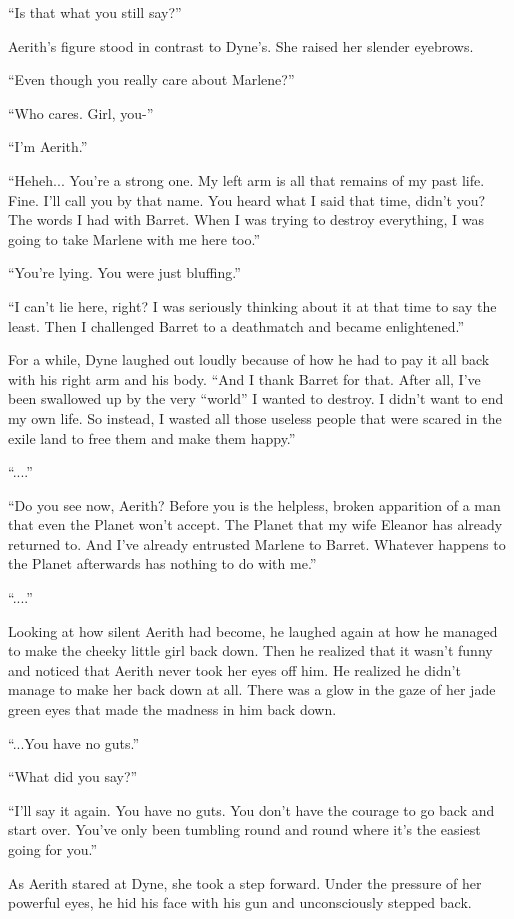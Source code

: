 \documentclass[oneside]{book}
\begin{document}
“Is that what you still say?”

Aerith's figure stood in contrast to Dyne's. She raised her slender eyebrows.

“Even though you really care about Marlene?”

“Who cares. Girl, you-”

“I'm Aerith.”

“Heheh... You're a strong one. My left arm is all that remains of my past life. Fine. I'll call you by that name. You heard what I said that time, didn't you? The words I had with Barret. When I was trying to destroy everything, I was going to take Marlene with me here too.”

“You're lying. You were just bluffing.”

“I can't lie here, right? I was seriously thinking about it at that time to say the least. Then I challenged Barret to a deathmatch and became enlightened.”

For a while, Dyne laughed out loudly because of how he had to pay it all back with his right arm and his body. “And I thank Barret for that. After all, I've been swallowed up by the very “world” I wanted to destroy. I didn't want to end my own life. So instead, I wasted all those useless people that were scared in the exile land to free them and make them happy.”

“....”

“Do you see now, Aerith? Before you is the helpless, broken apparition of a man that even the Planet won't accept. The Planet that my wife Eleanor has already returned to. And I've already entrusted Marlene to Barret. Whatever happens to the Planet afterwards has nothing to do with me.”

“....”

Looking at how silent Aerith had become, he laughed again at how he managed to make the cheeky little girl back down. Then he realized that it wasn't funny and noticed that Aerith never took her eyes off him. He realized he didn't manage to make her back down at all. There was a glow in the gaze of her jade green eyes that made the madness in him back down.

“...You have no guts.”

“What did you say?”

“I'll say it again. You have no guts. You don't have the courage to go back and start over. You've only been tumbling round and round where it's the easiest going for you.”

As Aerith stared at Dyne, she took a step forward. Under the pressure of her powerful eyes, he hid his face with his gun and unconsciously stepped back.
\end{document}
